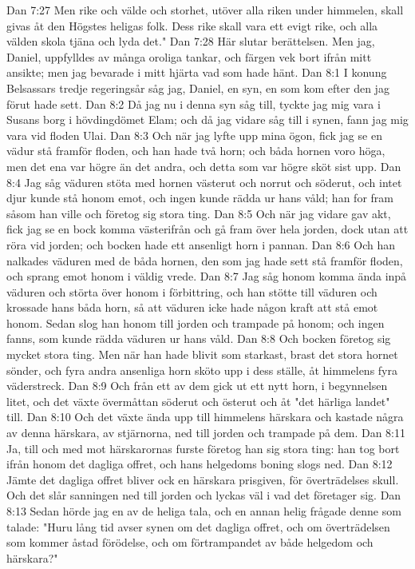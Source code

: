 Dan 7:27  Men rike och välde och storhet, utöver alla riken under himmelen, skall givas åt den Högstes heligas folk. Dess rike skall vara ett evigt rike, och alla välden skola tjäna och lyda det."
Dan 7:28  Här slutar berättelsen. Men jag, Daniel, uppfylldes av många oroliga tankar, och färgen vek bort ifrån mitt ansikte; men jag bevarade i mitt hjärta vad som hade hänt.
Dan 8:1  I konung Belsassars tredje regeringsår såg jag, Daniel, en syn, en som kom efter den jag förut hade sett.
Dan 8:2  Då jag nu i denna syn såg till, tyckte jag mig vara i Susans borg i hövdingdömet Elam; och då jag vidare såg till i synen, fann jag mig vara vid floden Ulai.
Dan 8:3  Och när jag lyfte upp mina ögon, fick jag se en vädur stå framför floden, och han hade två horn; och båda hornen voro höga, men det ena var högre än det andra, och detta som var högre sköt sist upp.
Dan 8:4  Jag såg väduren stöta med hornen västerut och norrut och söderut, och intet djur kunde stå honom emot, och ingen kunde rädda ur hans våld; han for fram såsom han ville och företog sig stora ting.
Dan 8:5  Och när jag vidare gav akt, fick jag se en bock komma västerifrån och gå fram över hela jorden, dock utan att röra vid jorden; och bocken hade ett ansenligt horn i pannan.
Dan 8:6  Och han nalkades väduren med de båda hornen, den som jag hade sett stå framför floden, och sprang emot honom i väldig vrede.
Dan 8:7  Jag såg honom komma ända inpå väduren och störta över honom i förbittring, och han stötte till väduren och krossade hans båda horn, så att väduren icke hade någon kraft att stå emot honom. Sedan slog han honom till jorden och trampade på honom; och ingen fanns, som kunde rädda väduren ur hans våld.
Dan 8:8  Och bocken företog sig mycket stora ting. Men när han hade blivit som starkast, brast det stora hornet sönder, och fyra andra ansenliga horn sköto upp i dess ställe, åt himmelens fyra väderstreck.
Dan 8:9  Och från ett av dem gick ut ett nytt horn, i begynnelsen litet, och det växte övermåttan söderut och österut och åt "det härliga landet" till.
Dan 8:10  Och det växte ända upp till himmelens härskara och kastade några av denna härskara, av stjärnorna, ned till jorden och trampade på dem.
Dan 8:11  Ja, till och med mot härskarornas furste företog han sig stora ting: han tog bort ifrån honom det dagliga offret, och hans helgedoms boning slogs ned.
Dan 8:12  Jämte det dagliga offret bliver ock en härskara prisgiven, för överträdelses skull. Och det slår sanningen ned till jorden och lyckas väl i vad det företager sig.
Dan 8:13  Sedan hörde jag en av de heliga tala, och en annan helig frågade denne som talade: "Huru lång tid avser synen om det dagliga offret, och om överträdelsen som kommer åstad förödelse, och om förtrampandet av både helgedom och härskara?"
